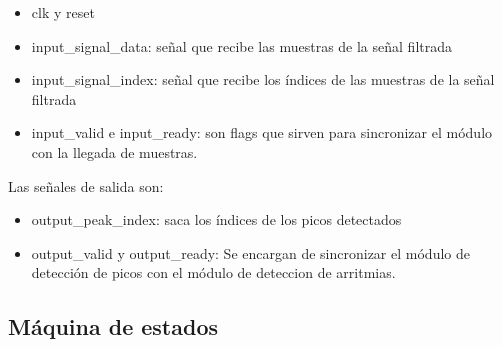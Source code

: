     \begin{itemize}
    \item clk y reset
    \item input\_signal\_data: señal que recibe las muestras de la señal filtrada 
    \item input\_signal\_index: señal que recibe los índices de las muestras de la señal filtrada 
    \item input\_valid e input\_ready: son flags que sirven para sincronizar el módulo con la llegada de muestras. 
    \end{itemize}
    
    Las señales de salida son:
    
    \begin{itemize}
        \item output\_peak\_index: saca los índices de los picos detectados
        \item output\_valid y output\_ready: Se encargan de sincronizar el módulo de detección de picos 
        con el módulo de deteccion de arritmias.
    \end{itemize}

\subsection{Máquina de estados}

